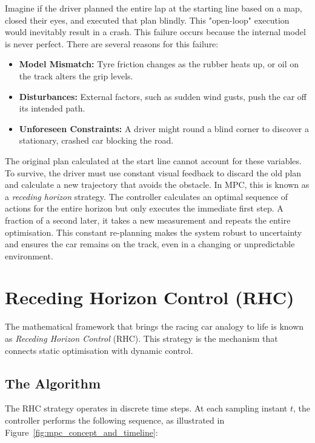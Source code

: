 Imagine if the driver planned the entire lap at the starting line based on a map, closed their eyes, and executed that plan blindly. This "open-loop" execution would inevitably result in a crash. This failure occurs because the internal model is never perfect. There are several reasons for this failure:
\begin{itemize}
	\item \textbf{Model Mismatch:} Tyre friction changes as the rubber heats up, or oil on the track alters the grip levels. 
	\item \textbf{Disturbances:} External factors, such as sudden wind gusts, push the car off its intended path.
	\item \textbf{Unforeseen Constraints:} A driver might round a blind corner to discover a stationary, crashed car blocking the road.
\end{itemize}
The original plan calculated at the start line cannot account for these variables. To survive, the driver must use constant visual feedback to discard the old plan and calculate a new trajectory that avoids the obstacle.
In MPC, this is known as a \emph{receding horizon} strategy. The controller calculates an optimal sequence of actions for the entire horizon but only executes the immediate first step. A fraction of a second later, it takes a new measurement and repeats the entire optimisation. This constant re-planning makes the system robust to uncertainty and ensures the car remains on the track, even in a changing or unpredictable environment.

\section{Receding Horizon Control (RHC)}

The mathematical framework that brings the racing car analogy to life is known as \textit{Receding Horizon Control} (RHC). This strategy is the mechanism that connects static optimisation with dynamic control.

\subsection{The Algorithm}
The RHC strategy operates in discrete time steps. At each sampling instant $t$, the controller performs the following sequence, as illustrated in Figure~\ref{fig:mpc_concept_and_timeline}:

